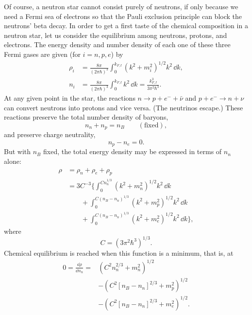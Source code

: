 Of course, a neutron star cannot consist purely of neutrons, if only because
we need a Fermi sea of electrons so that the Pauli exclusion principle can
block the neutrons' beta decay. In order to get a first taste of the chemical
composition in a neutron star, let us consider the equilibrium among neutrons,
protons, and electrons. The energy density and number density of each one of
these three Fermi gases are given (for \(i=n,p,e\)) by
\begin{align}
  \rho_i
  &=
  \frac{8\pi}{(2\pi\hbar)^3}
  \int_0^{k_{F,\ii}}(k^2+m_i^2)^{1/2}k^2\,\dd k,
  \tag{11.4.18}\label{eq:11.4.18}\\
  n_i
  &=
  \frac{8\pi}{(2\pi\hbar)^3}
  \int_0^{k_{F,\ii}}k^2\,\dd k
  =
  \frac{k_{F,\ii}^3}{3\pi^2\hbar^3}.
  \tag{11.4.19}\label{eq:11.4.19}
\end{align}
At any given point in the star, the reactions
\(n\to p+e^-+\bar\nu\) and \(p+e^-\to n+\nu\) can convert neutrons into
protons and vice versa. (The neutrinos escape.) These reactions preserve the
total number density of baryons,
\begin{equation}
  n_n+n_p=n_B\qquad(\text{fixed}),
  \tag{11.4.20}\label{eq:11.4.20}
\end{equation}
and preserve charge neutrality,
\begin{equation}
  n_p-n_e=0.
  \tag{11.4.21}\label{eq:11.4.21}
\end{equation}
But with \(n_B\) fixed, the total energy density may be expressed in terms of
\(n_n\) alone:
\begin{equation}
  \begin{aligned}
  \rho
  &=
  \rho_n+\rho_e+\rho_p\\
  &=
  3C^{-3}\bigg\{
    \int_0^{Cn_n^{1/3}}(k^2+m_n^2)^{1/2}k^2\,\dd k\\
  &\qquad
    +\int_0^{C(n_B-n_n)^{1/3}}(k^2+m_p^2)^{1/2}k^2\,\dd k\\
  &\qquad
    +\int_0^{C(n_B-n_n)^{1/3}}(k^2+m_e^2)^{1/2}k^2\,\dd k
  \bigg\},
  \end{aligned}
  \tag{11.4.22}\label{eq:11.4.22}
\end{equation}
where
\[
  C=(3\pi^2\hbar^3)^{1/3}.
\]
Chemical equilibrium is reached when this function is a minimum, that is, at
\[
  \begin{aligned}
  0=\frac{\dd\rho}{\dd n_n}
  ={}&
  (C^2n_n^{2/3}+m_n^2)^{1/2}\\
  &-(C^2[n_B-n_n]^{2/3}+m_p^2)^{1/2}\\
  &-(C^2[n_B-n_n]^{2/3}+m_e^2)^{1/2}.
  \end{aligned}
\]

